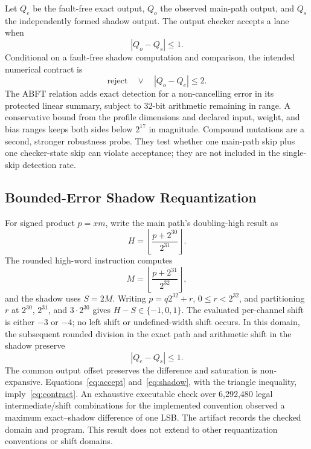 \documentclass[conference]{IEEEtran}
\begin{document}
Let $Q_e$ be the fault-free exact output, $Q_o$ the observed main-path output, and $Q_s$ the independently formed shadow output. The output checker accepts a lane when
\begin{equation}
 |Q_o-Q_s|\leq 1.
 \label{eq:accept}
\end{equation}
Conditional on a fault-free shadow computation and comparison, the intended numerical contract is
\begin{equation}
 \text{reject}\quad\lor\quad |Q_o-Q_e|\leq2.
 \label{eq:contract}
\end{equation}
The ABFT relation adds exact detection for a non-cancelling error in its protected linear summary, subject to 32-bit arithmetic remaining in range. A conservative bound from the profile dimensions and declared input, weight, and bias ranges keeps both sides below $2^{17}$ in magnitude. Compound mutations are a second, stronger robustness probe. They test whether one main-path skip plus one checker-state skip can violate acceptance; they are not included in the single-skip detection rate.

\subsection{Bounded-Error Shadow Requantization}
For signed product $p=xm$, write the main path's doubling-high result as
\begin{equation}
 H=\left\lfloor\frac{p+2^{30}}{2^{31}}\right\rfloor.
\end{equation}
The rounded high-word instruction computes
\begin{equation}
 M=\left\lfloor\frac{p+2^{31}}{2^{32}}\right\rfloor,
\end{equation}
and the shadow uses $S=2M$. Writing $p=q2^{32}+r$, $0\leq r<2^{32}$, and partitioning $r$ at $2^{30}$, $2^{31}$, and $3\cdot2^{30}$ gives $H-S\in\{-1,0,1\}$. The evaluated per-channel shift is either $-3$ or $-4$; no left shift or undefined-width shift occurs. In this domain, the subsequent rounded division in the exact path and arithmetic shift in the shadow preserve
\begin{equation}
 |Q_e-Q_s|\leq1.
 \label{eq:shadow}
\end{equation}
The common output offset preserves the difference and saturation is non-expansive. Equations~\eqref{eq:accept} and~\eqref{eq:shadow}, with the triangle inequality, imply~\eqref{eq:contract}. An exhaustive executable check over 6,292,480 legal intermediate/shift combinations for the implemented convention observed a maximum exact--shadow difference of one LSB. The artifact records the checked domain and program. This result does not extend to other requantization conventions or shift domains.
\end{document}
